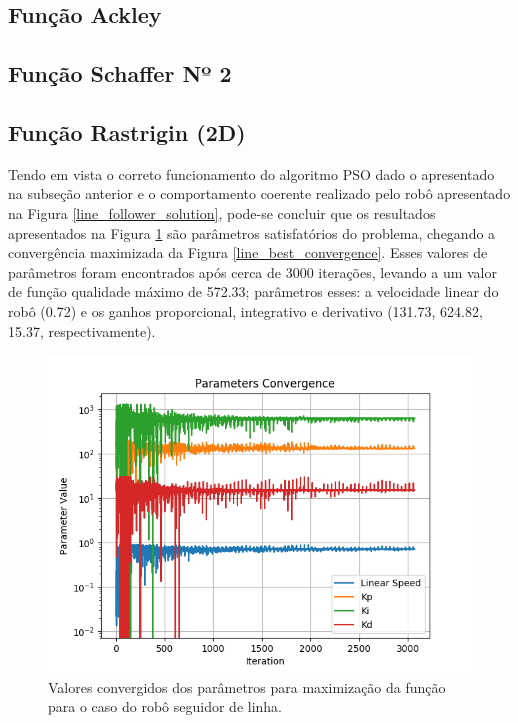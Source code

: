 \documentclass[conference]{IEEEtran}
\begin{document}
\subsection{Função Ackley}
\subsection{Função Schaffer Nº 2}
\subsection{Função Rastrigin (2D)}

Tendo em vista o correto funcionamento do algoritmo PSO dado o apresentado na subseção anterior e o comportamento coerente realizado pelo robô apresentado na Figura \ref{line_follower_solution}, pode-se concluir que os resultados apresentados na Figura \ref{line_parameters_convergence} são parâmetros satisfatórios do problema, chegando a convergência maximizada da Figura \ref{line_best_convergence}. Esses valores de parâmetros foram encontrados após cerca de 3000 iterações, levando a um valor de função qualidade máximo de 572.33; parâmetros esses: a velocidade linear do robô (0.72) e os ganhos proporcional, integrativo e derivativo (131.73, 624.82, 15.37, respectivamente).

\begin{figure}[htbp]
\centering
\centerline{\includegraphics[scale=0.4]{line_parameters_convergence.png}}
\caption{Valores convergidos dos parâmetros para maximização da função para o caso do robô seguidor de linha.}
\label{line_parameters_convergence}
\end{figure}
\end{document}
